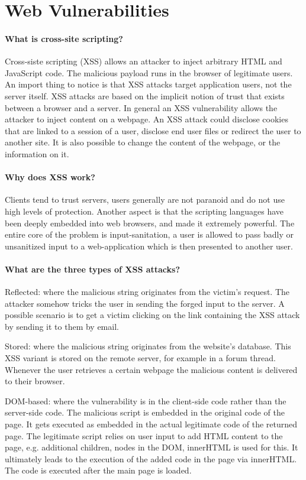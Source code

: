 \section{Web Vulnerabilities}
\paragraph{What is cross-site scripting?}
Cross-siste scripting (XSS) allows an attacker to inject arbitrary HTML and JavaScript code. The malicious payload runs in the browser of legitimate users. An import thing to notice is that XSS attacks target application users, not the server itself. XSS attacks are based on the implicit notion of trust that exists between a browser and a server. In general an XSS vulnerability allows the attacker to inject content on a webpage. An XSS attack could disclose cookies that are linked to a session of a user, disclose end user files or redirect the user to another site. It is also possible to change the content of the webpage, or the information on it.

\paragraph{Why does XSS work?}
Clients tend to trust servers, users generally are not paranoid and do not use high levels of protection. Another aspect is that the scripting languages have been deeply embedded into web browsers, and made it extremely powerful. The entire core of the problem is input-sanitation, a user is allowed to pass badly or unsanitized input to a web-application which is then presented to another user.

\paragraph{What are the three types of XSS attacks?}
Reflected: where the malicious string originates from the victim's request. The attacker somehow tricks the user in sending the forged input to the server. A possible scenario is to get a victim clicking on the link containing the XSS attack by sending it to them by email.

Stored: where the malicious string originates from the website's database. This XSS variant is stored on the remote server, for example in a forum thread. Whenever the user retrieves a certain webpage the malicious content is delivered to their browser.

DOM-based: where the vulnerability is in the client-side code rather than the server-side code. The malicious script is embedded in the original code of the page. It gets executed as embedded in the actual legitimate code of the returned page. The legitimate script relies on user input to add HTML content to the page, e.g. additional children, nodes in the DOM, innerHTML is used for this. It ultimately leads to the execution of the added code in the page via innerHTML. The code is executed after the main page is loaded.

